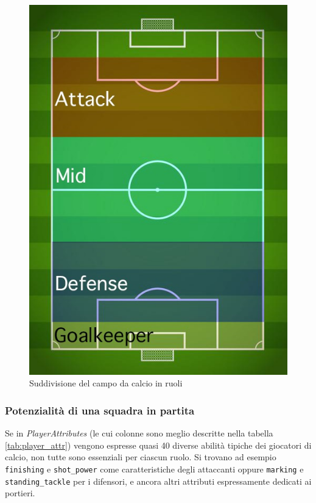 \documentclass[hidelinks, 12pt]{article}
\begin{document}
\begin{figure}[H]
	\centering
	\includegraphics[scale=0.7]{images/soccer-field-horizontal.png}
	\caption[Suddivisione del campo da calcio in ruoli]{Suddivisione del campo da calcio in ruoli}
	\label{fig:soccer-field}
\end{figure}


\subsubsection{Potenzialità di una squadra in partita}

Se in \textit{PlayerAttributes} (le cui colonne sono meglio descritte nella tabella \ref{tab:player_attr}) vengono espresse quasi 40 diverse abilità tipiche dei giocatori di calcio, non tutte sono essenziali per ciascun ruolo. Si trovano ad esempio \texttt{finishing} e \texttt{shot\_power} come caratteristiche degli attaccanti oppure \texttt{marking} e \texttt{standing\_tackle} per i difensori, e ancora altri attributi espressamente dedicati ai portieri.
\end{document}
